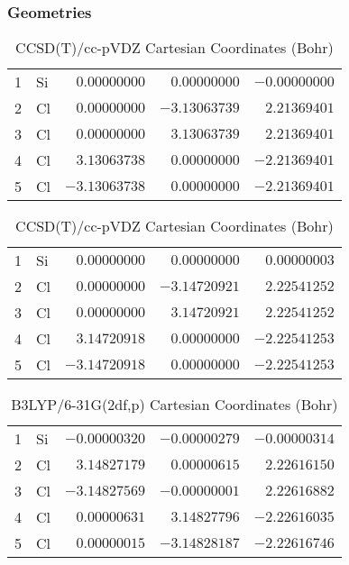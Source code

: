 \documentclass[10pt,oneside]{article}
\begin{document}
\begin{table}[h!]
\subsubsection*{Geometries}
\begin{multicols}{2}
\centering
\caption{CCSD(T)/cc-pVTZ Cartesian Coordinates (Bohr)}
\begin{tabular}{llrrr}
\toprule
1  & Si & $ 0.00000000$ & $ 0.00000000$ & $-0.00000000$ \\
2  & Cl & $ 0.00000000$ & $-3.13063739$ & $ 2.21369401$ \\
3  & Cl & $ 0.00000000$ & $ 3.13063739$ & $ 2.21369401$ \\
4  & Cl & $ 3.13063738$ & $ 0.00000000$ & $-2.21369401$ \\
5  & Cl & $-3.13063738$ & $ 0.00000000$ & $-2.21369401$ \\
\bottomrule
\end{tabular}
\caption{CCSD(T)/cc-pVDZ Cartesian Coordinates (Bohr)}
\begin{tabular}{llrrr}
\toprule
1  & Si & $ 0.00000000$ & $ 0.00000000$ & $ 0.00000003$ \\
2  & Cl & $ 0.00000000$ & $-3.14720921$ & $ 2.22541252$ \\
3  & Cl & $ 0.00000000$ & $ 3.14720921$ & $ 2.22541252$ \\
4  & Cl & $ 3.14720918$ & $ 0.00000000$ & $-2.22541253$ \\
5  & Cl & $-3.14720918$ & $ 0.00000000$ & $-2.22541253$ \\
\bottomrule
\end{tabular}
\end{multicols}
\end{table}

\begin{table}[h]
\centering
\caption{B3LYP/6-31G(2df,p) Cartesian Coordinates (Bohr)}
\begin{tabular}{llrrr}
\toprule
1  & Si & $-0.00000320$ & $-0.00000279$ & $-0.00000314$ \\
2  & Cl & $ 3.14827179$ & $ 0.00000615$ & $ 2.22616150$ \\
3  & Cl & $-3.14827569$ & $-0.00000001$ & $ 2.22616882$ \\
4  & Cl & $ 0.00000631$ & $ 3.14827796$ & $-2.22616035$ \\
5  & Cl & $ 0.00000015$ & $-3.14828187$ & $-2.22616746$ \\
\bottomrule
\end{tabular}
\end{table}
\end{document}
